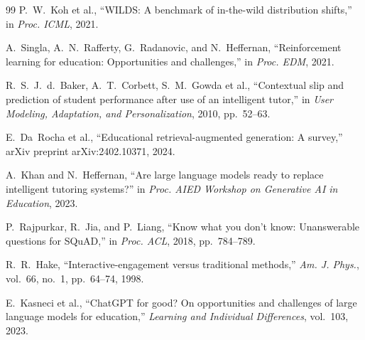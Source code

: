 \documentclass[conference]{IEEEtran}
\begin{document}
\begin{thebibliography}{99}
 P.~W.~Koh et al., ``WILDS: A benchmark of
in-the-wild distribution shifts,'' in \emph{Proc. ICML}, 2021.

 A.~Singla, A.~N.~Rafferty, G.~Radanovic,
and N.~Heffernan, ``Reinforcement learning for education:
Opportunities and challenges,'' in \emph{Proc. EDM}, 2021.

 R.~S.~J.~d.~Baker, A.~T.~Corbett,
S.~M.~Gowda et al., ``Contextual slip and prediction of student
performance after use of an intelligent tutor,'' in \emph{User
Modeling, Adaptation, and Personalization}, 2010, pp.~52--63.

 E.~Da~Rocha et al., ``Educational
retrieval-augmented generation: A survey,'' arXiv preprint
arXiv:2402.10371, 2024.

 A.~Khan and N.~Heffernan, ``Are large
language models ready to replace intelligent tutoring systems?''
in \emph{Proc. AIED Workshop on Generative AI in Education}, 2023.

 P.~Rajpurkar, R.~Jia, and P.~Liang,
``Know what you don't know: Unanswerable questions for SQuAD,''
in \emph{Proc. ACL}, 2018, pp.~784--789.

 R.~R.~Hake, ``Interactive-engagement versus
traditional methods,'' \emph{Am. J. Phys.}, vol.~66, no.~1,
pp.~64--74, 1998.

 E.~Kasneci et al., ``ChatGPT for good?
On opportunities and challenges of large language models for
education,'' \emph{Learning and Individual Differences},
vol.~103, 2023.

\end{thebibliography}
\end{document}
